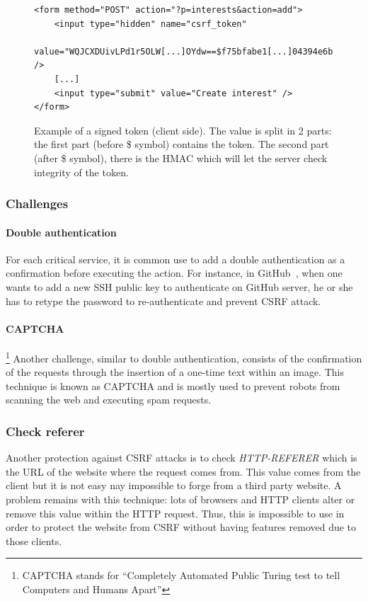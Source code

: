 \documentclass[a4paper,11pt,openany]{report}
\begin{document}
  \begin{figure}[h!t]
  \begin{verbatim}
<form method="POST" action="?p=interests&action=add">
    <input type="hidden" name="csrf_token" 
        value="WQJCXDUivLPd1r5OLW[...]OYdw==$f75bfabe1[...]04394e6b" />
    [...]
    <input type="submit" value="Create interest" />
</form>
  \end{verbatim}
  \caption{Example of a signed token (client side). The value is split in 2 parts: the first part 
  (before \$ symbol) contains the token. The second part (after \$ symbol), there is the HMAC which 
  will let the server check integrity of the token.}
  \label{figure:signed_token_client}
  \end{figure}
  
  \subsubsection{Challenges}
  
  \paragraph{Double authentication}
  For each critical service, it is common use to add a double authentication as a confirmation 
  before executing the action. For instance, in GitHub~\cite{github}, when one wants to add a new 
  SSH public key to authenticate on GitHub server, he or she has to retype the password to 
  re-authenticate and prevent CSRF attack.
  
  \vspace*{-20pt}
  
  \paragraph{CAPTCHA}\footnote{CAPTCHA stands for ``Completely Automated Public Turing test to tell Computers and 
  Humans Apart''}
  Another challenge, similar to double authentication, consists of the confirmation of the requests 
  through the insertion of a one-time text within an image. This technique is known as CAPTCHA
  and is mostly used to prevent robots from scanning the web and executing spam 
  requests.
  
  \subsubsection{Check referer}
  Another protection against CSRF attacks is to check \textit{HTTP-REFERER} which is the URL of the 
  website where the request comes from. This value comes from the client but it is not easy nay impossible 
  to forge from a third party website. A problem remains with this technique: lots of browsers and HTTP 
  clients alter or remove this value within the HTTP request. Thus, this is impossible to use in order 
  to protect the website from CSRF without having features removed due to those clients.
   
\end{document}
